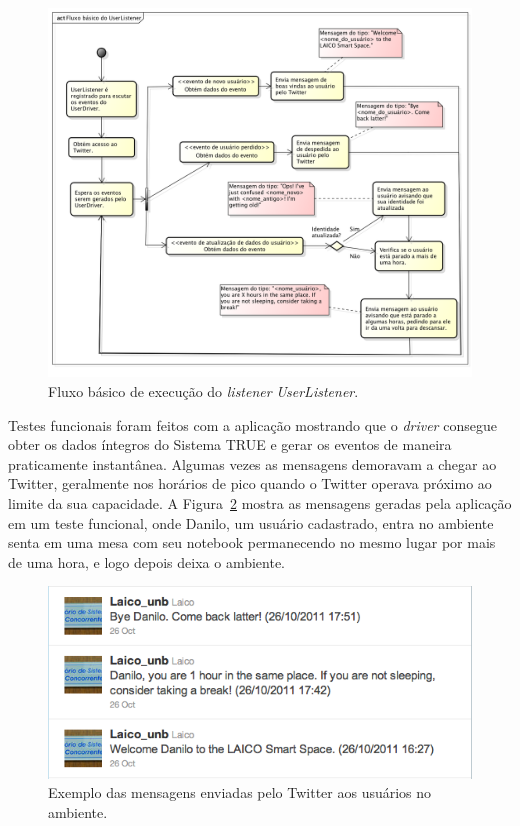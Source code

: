 	\begin{figure}[hbt]
		\begin{center}
			\includegraphics[scale=0.45]{figuras/5.Testes/diagrama-user-tweet.png}
		\end{center}
		\caption{Fluxo básico de execução do \textit{listener} \textit{UserListener}.}
		\label{fig:diagrama-tweet}
	\end{figure}

	Testes funcionais foram feitos com a aplicação mostrando que o \textit{driver} consegue
	obter os dados íntegros do Sistema TRUE e gerar os eventos de maneira praticamente
	instantânea. Algumas vezes as mensagens demoravam a chegar ao Twitter,
	geralmente nos horários de pico quando o Twitter operava próximo ao limite
	da sua capacidade. A Figura~\ref{fig:tweets} mostra as mensagens geradas
	pela aplicação em um teste funcional, onde Danilo, um usuário cadastrado,
	entra no ambiente senta em uma mesa com seu notebook permanecendo no mesmo
	lugar por mais de uma hora, e logo depois deixa o ambiente.

	\begin{figure}[hbt]
			\begin{center}
				\includegraphics[scale=0.6]{figuras/5.Testes/tweets.png}
			\end{center}
			\caption{Exemplo das mensagens enviadas pelo Twitter aos usuários no ambiente.}
			\label{fig:tweets}
		\end{figure}	